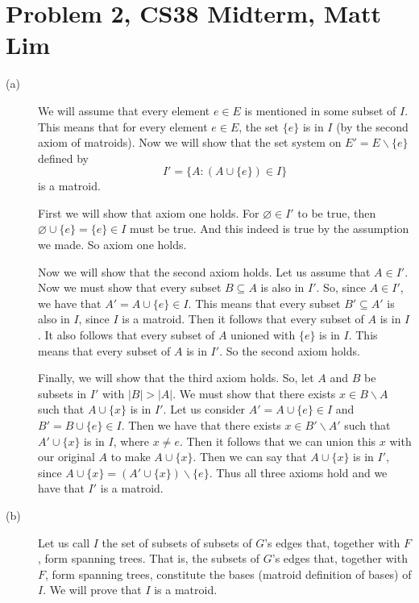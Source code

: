 \documentclass{article}
\begin{document}
\section*{Problem 2, CS38 Midterm, Matt Lim}
\begin{description}
    \item[(a)]
        We will assume that every element $e \in E$ is mentioned in some subset
        of $I$. This means that for every element $e \in E$, the set $\{e\}$
        is in $I$ (by the second axiom of matroids). Now we will show that the set system on
        $E' = E \backslash \{e\}$ defined by
        \[ I' = \{A : (A \cup \{e\}) \in I\} \]
        is a matroid.

        First we will show that axiom one holds. For $\varnothing \in I'$ to be
        true, then $\varnothing \cup \{e\} = \{e\} \in I$ must be true. And this
        indeed is true by the assumption we made. So axiom one holds.

        Now we will show that the second axiom holds. Let us assume that $A \in
        I'$. Now we must show that every subset $B \subseteq A$ is also in $I'$.
        So, since $A \in I'$, we have that $A' = A \cup \{e\} \in I$. This means that
        every subset $B' \subseteq A'$ is also in $I$, since $I$ is a matroid.
        Then it follows that every subset of $A$ is in $I$. It also follows that
        every subset of $A$ unioned with $\{e\}$ is in $I$. This means that
        every subset of $A$ is in $I'$. So the second axiom holds.

        Finally, we will show that the third axiom holds. So, let $A$ and $B$ be
        subsets in $I'$ with $|B| > |A|$. We must show that there exists $x \in
        B \backslash A$ such that $A \cup \{x\}$ is in $I'$. Let us consider
        $A' = A \cup \{e\} \in I$ and $B' = B \cup \{e\} \in I$. Then we have
        that there exists $x \in B' \backslash A'$ such that $A' \cup \{x\}$ is
        in $I$, where $x \neq e$. Then it follows that we can union this $x$
        with our original $A$ to make $A \cup \{x\}$. Then we can say that $A
        \cup \{x\}$ is in $I'$, since $A \cup \{x\} = (A' \cup \{x\}) \backslash
        \{e\}$. Thus all three axioms hold and we have that $I'$ is a matroid.
    \item[(b)]
        Let us call $I$ the set of subsets of subsets of $G$'s edges that, together with $F$,
        form spanning trees. That is, the subsets of $G$'s edges that, together
        with $F$, form spanning trees, constitute the bases (matroid definition
        of bases) of $I$.
        We will prove that $I$ is a matroid.


\end{description}
\end{document}
